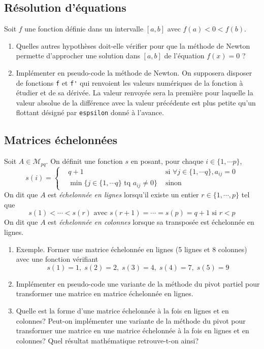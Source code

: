 \subsection{Résolution d'équations}
Soit $f$ une fonction définie dans un intervalle $[a,b]$ avec $f(a)<0<f(b)$.
\begin{enumerate}
  \item Quelles autres hypothèses doit-elle vérifier pour que la méthode de Newton permette d'approcher une solution dans $[a,b]$ de l'équation $f(x)=0$ ?
  \item Implémenter en pseudo-code la méthode de Newton. On supposera disposer de fonctions \verb|f| et \verb|f'| qui renvoient les valeurs numériques de la fonction à étudier et de sa dérivée. La valeur renvoyée sera la première pour laquelle la valeur absolue de la différence avec la valeur précédente est plus petite qu'un flottant désigné par \verb|espsilon| donné à l'avance.
\end{enumerate}
\subsection{Matrices échelonnées}
Soit $A\in \mathcal{M}_{p q}$. On définit une fonction $s$  en posant, pour chaque $i \in \{1,\cdots p\}$,
\begin{displaymath}
  s(i)=
\left\lbrace 
\begin{aligned}
  &q+1 &\text{ si }\forall j\in\{1,\cdots q\}, a_{i j}=0\\
  &\min\{j\in\{1,\cdots q\}\text{ tq }a_{i j}\neq 0\} &\text{ sinon}
\end{aligned}
\right. 
\end{displaymath}
On dit que $A$ est \emph{échelonnée en lignes} lorsqu'il existe un entier $r\in \{1,\cdots,p\}$ tel que
\begin{displaymath}
s(1)<\cdots <s(r) \text{ avec } s(r+1)=\cdots = s(p)=q+1\text{ si } r<p
\end{displaymath}
On dit que $A$ est \emph{échelonnée en colonnes} lorsque sa transposée est échelonnée en lignes.

\begin{enumerate}
  \item Exemple. Former une matrice échelonnée en lignes  (5 lignes et 8 colonnes) avec une fonction vérifiant 
\begin{displaymath}
  s(1)=1,\; s(2)=2,\; s(3)= 4,\; s(4)= 7,\; s(5) = 9
\end{displaymath}
\item Implémenter en pseudo-code une variante de la méthode du pivot partiel pour transformer une matrice en matrice échelonnée en lignes.
\item Quelle est la forme d'une matrice échelonnée à la fois en lignes et en colonnes? Peut-on implémenter une variante de la méthode du pivot pour transformer une matrice en une matrice échelonnée à la fois en lignes et en colonnes? Quel résultat mathématique retrouve-t-on ainsi?
\end{enumerate}
